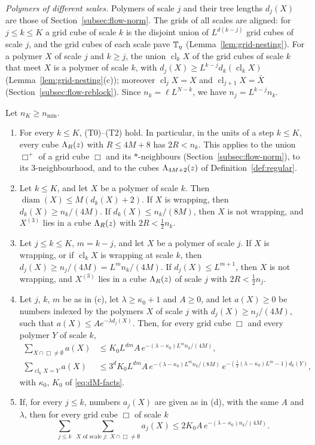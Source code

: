 \emph{Polymers of different scales.} Polymers of scale $j$ and their tree lengths $d_j(X)$ are those of Section~\ref{subsec:flow-norm}. The grids of all scales are aligned: for $j\le k\le K$ a grid cube of scale $k$ is the disjoint union of $L^{d(k-j)}$ grid cubes of scale $j$, and the grid cubes of each scale pave $\mathbb T_\eta$ (Lemma~\ref{lem:grid-nesting}). For a polymer $X$ of scale $j$ and $k\ge j$, the union $\operatorname{cl}_kX$ of the grid cubes of scale $k$ that meet $X$ is a polymer of scale $k$, with $d_j(X)\ge L^{k-j}d_k(\operatorname{cl}_kX)$ (Lemma~\ref{lem:grid-nesting}(c)); moreover $\operatorname{cl}_jX=X$ and $\operatorname{cl}_{j+1}X=\bar X$ (Section~\ref{subsec:flow-reblock}). Since $n_k=\ell L^{N-k}$, we have $n_j=L^{k-j}n_k$.

\begin{lemma}\label{lem:torus}
Let $n_K\ge n_{\min}$.
\begin{enumerate}[label=(\alph*)]
\item For every $k\le K$, (T0)--(T2) hold. In particular, in the units of a step $k\le K$, every cube $\Lambda_R(z)$ with $R\le4M+8$ has $2R<n_k$. This applies to the union $\Box^+$ of a grid cube $\Box$ and its $*$-neighbours (Section~\ref{subsec:flow-norm}), to its $3$-neighbourhood, and to the cubes $\Lambda_{4M+2}(z)$ of Definition~\ref{def:regular}.
\item Let $k\le K$, and let $X$ be a polymer of scale $k$. Then $\operatorname{diam}(X)\le M(d_k(X)+2)$. If $X$ is wrapping, then $d_k(X)\ge n_k/(4M)$. If $d_k(X)\le n_k/(8M)$, then $X$ is not wrapping, and $X^{(3)}$ lies in a cube $\Lambda_R(z)$ with $2R<\frac12n_k$.
\item Let $j\le k\le K$, $m=k-j$, and let $X$ be a polymer of scale $j$. If $X$ is wrapping, or if $\operatorname{cl}_kX$ is wrapping at scale $k$, then $d_j(X)\ge n_j/(4M)=L^mn_k/(4M)$. If $d_j(X)\le L^{m+1}$, then $X$ is not wrapping, and $X^{(3)}$ lies in a cube $\Lambda_R(z)$ of scale $j$ with $2R<\frac12n_j$.
\item Let $j$, $k$, $m$ be as in (c), let $\lambda\ge\kappa_0+1$ and $A\ge0$, and let $a(X)\ge0$ be numbers indexed by the polymers $X$ of scale $j$ with $d_j(X)\ge n_j/(4M)$, such that $a(X)\le Ae^{-\lambda d_j(X)}$. Then, for every grid cube $\Box$ and every polymer $Y$ of scale $k$,
\[
\begin{aligned}
\sum_{X\cap\Box\ne\emptyset}a(X)&\le K_0L^{dm}A\,e^{-(\lambda-\kappa_0)L^mn_k/(4M)},\\
\sum_{\operatorname{cl}_kX=Y}a(X)&\le3^dK_0L^{dm}A\,e^{-(\lambda-\kappa_0)L^mn_k/(8M)}\,e^{-(\frac12(\lambda-\kappa_0)L^m-1)d_k(Y)},
\end{aligned}
\]
with $\kappa_0$, $K_0$ of \eqref{eq:dM-facts}.
\item If, for every $j\le k$, numbers $a_j(X)$ are given as in (d), with the same $A$ and $\lambda$, then for every grid cube $\Box$ of scale $k$
\[
\sum_{j\le k}\ \sum_{X\text{ of scale }j:\ X\cap\Box\ne\emptyset}a_j(X)\le2K_0A\,e^{-(\lambda-\kappa_0)n_k/(4M)} .
\]
\end{enumerate}
\end{lemma}

